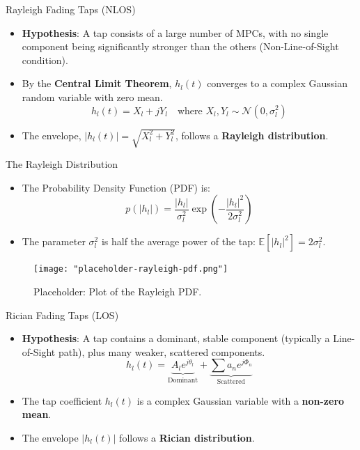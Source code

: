 \documentclass{beamer}
\begin{document}
	\begin{frame}{Rayleigh Fading Taps (NLOS)}
		\begin{itemize}
			\item \textbf{Hypothesis}: A tap consists of a large number of MPCs, with no single component being significantly stronger than the others (Non-Line-of-Sight condition).
			
			\item By the \textbf{Central Limit Theorem}, $h_l(t)$ converges to a complex Gaussian random variable with zero mean.
			\[ h_l(t) = X_l + jY_l \quad \text{where } X_l, Y_l \sim \mathcal{N}(0, \sigma_l^2) \]
			
			\item The envelope, $|h_l(t)| = \sqrt{X_l^2 + Y_l^2}$, follows a \textbf{Rayleigh distribution}.
		\end{itemize}
	\end{frame}
	
	\begin{frame}{The Rayleigh Distribution}
		\begin{itemize}
			\item The Probability Density Function (PDF) is:
			\[ p(|h_l|) = \frac{|h_l|}{\sigma_l^2} \exp\left(-\frac{|h_l|^2}{2\sigma_l^2}\right) \]
			
			\item The parameter $\sigma_l^2$ is half the average power of the tap: $\mathbb{E}[|h_l|^2] = 2\sigma_l^2$.
		\end{itemize}
		\begin{figure}
			\centering
			\texttt{[image: "placeholder-rayleigh-pdf.png"]}
			\caption{Placeholder: Plot of the Rayleigh PDF.}
		\end{figure}
	\end{frame}
	
	\begin{frame}{Rician Fading Taps (LOS)}
		\begin{itemize}
			\item \textbf{Hypothesis}: A tap contains a dominant, stable component (typically a Line-of-Sight path), plus many weaker, scattered components.
			\[ h_l(t) = \underbrace{A_l e^{j\theta_l}}_{\text{Dominant}} + \underbrace{\sum a_n e^{j\Phi_n}}_{\text{Scattered}} \]
			
			\item The tap coefficient $h_l(t)$ is a complex Gaussian variable with a \textbf{non-zero mean}.
			
			\item The envelope $|h_l(t)|$ follows a \textbf{Rician distribution}.
		\end{itemize}
	\end{frame}
	
\end{document}
